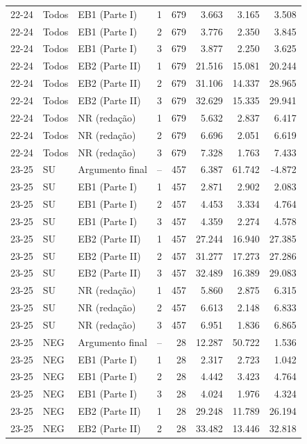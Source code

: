 \begin{longtable}{lllcrrrr}
22-24 & Todos & EB1 (Parte I) & 1 & 679 & 3.663 & 3.165 & 3.508 \\
22-24 & Todos & EB1 (Parte I) & 2 & 679 & 3.776 & 2.350 & 3.845 \\
22-24 & Todos & EB1 (Parte I) & 3 & 679 & 3.877 & 2.250 & 3.625 \\
22-24 & Todos & EB2 (Parte II) & 1 & 679 & 21.516 & 15.081 & 20.244 \\
22-24 & Todos & EB2 (Parte II) & 2 & 679 & 31.106 & 14.337 & 28.965 \\
22-24 & Todos & EB2 (Parte II) & 3 & 679 & 32.629 & 15.335 & 29.941 \\
22-24 & Todos & NR (redação) & 1 & 679 & 5.632 & 2.837 & 6.417 \\
22-24 & Todos & NR (redação) & 2 & 679 & 6.696 & 2.051 & 6.619 \\
22-24 & Todos & NR (redação) & 3 & 679 & 7.328 & 1.763 & 7.433 \\
\midrule
23-25 & SU & Argumento final & -- & 457 & 6.387 & 61.742 & -4.872 \\
23-25 & SU & EB1 (Parte I) & 1 & 457 & 2.871 & 2.902 & 2.083 \\
23-25 & SU & EB1 (Parte I) & 2 & 457 & 4.453 & 3.334 & 4.764 \\
23-25 & SU & EB1 (Parte I) & 3 & 457 & 4.359 & 2.274 & 4.578 \\
23-25 & SU & EB2 (Parte II) & 1 & 457 & 27.244 & 16.940 & 27.385 \\
23-25 & SU & EB2 (Parte II) & 2 & 457 & 31.277 & 17.273 & 27.286 \\
23-25 & SU & EB2 (Parte II) & 3 & 457 & 32.489 & 16.389 & 29.083 \\
23-25 & SU & NR (redação) & 1 & 457 & 5.860 & 2.875 & 6.315 \\
23-25 & SU & NR (redação) & 2 & 457 & 6.613 & 2.148 & 6.833 \\
23-25 & SU & NR (redação) & 3 & 457 & 6.951 & 1.836 & 6.865 \\
23-25 & NEG & Argumento final & -- & 28 & 12.287 & 50.722 & 1.536 \\
23-25 & NEG & EB1 (Parte I) & 1 & 28 & 2.317 & 2.723 & 1.042 \\
23-25 & NEG & EB1 (Parte I) & 2 & 28 & 4.442 & 3.423 & 4.764 \\
23-25 & NEG & EB1 (Parte I) & 3 & 28 & 4.024 & 1.976 & 4.324 \\
23-25 & NEG & EB2 (Parte II) & 1 & 28 & 29.248 & 11.789 & 26.194 \\
23-25 & NEG & EB2 (Parte II) & 2 & 28 & 33.482 & 13.446 & 32.818 \\

\end{longtable}
